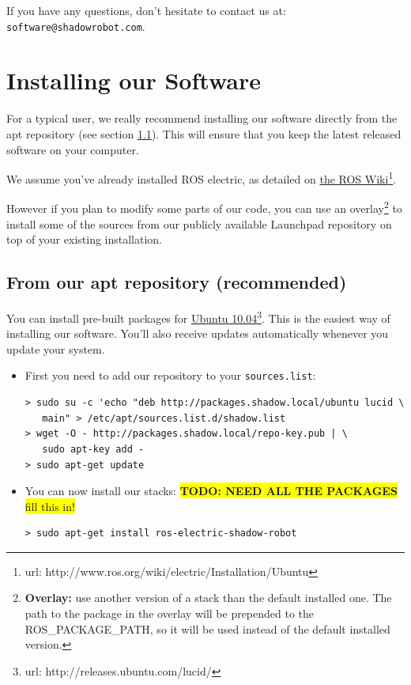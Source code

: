 \documentclass[12pt]{article}
\newcommand{\todo}[1]{\colorbox{yellow}{\textbf{TODO: #1} fill this in!}}
\newcommand{\betterhref}[2]{\href{#1}{#2}\footnote{url: #1}}
\begin{document}
\par If you have any questions, don't hesitate to contact us at: \texttt{software@shadowrobot.com}.\\

\newpage

\section{Installing our Software}
\label{sec:install}
\par For a typical user, we really recommend installing our software directly from the apt repository (see section \ref{sec:install-apt}). This will ensure that you keep the latest released software on your computer.\\

\par We assume you've already installed ROS electric, as detailed on \betterhref{http://www.ros.org/wiki/electric/Installation/Ubuntu}{the ROS Wiki}.\\

\par However if you plan to modify some parts of our code, you can use an overlay\footnote{\textbf{Overlay:} use another version of a stack than the default installed one. The path to the package in the overlay will be prepended to the ROS\_PACKAGE\_PATH, so it will be used instead of the default installed version.} to install some of the sources from our publicly available Launchpad repository on top of your existing installation.

\subsection{From our apt repository (recommended)}
\label{sec:install-apt}
\par You can install pre-built packages for \betterhref{http://releases.ubuntu.com/lucid/}{Ubuntu 10.04}. This is the easiest way of installing our software. You'll also receive updates automatically whenever you update your system.

\begin{itemize}
\item First you need to add our repository to your \texttt{sources.list}:
  \begin{lstlisting}
> sudo su -c 'echo "deb http://packages.shadow.local/ubuntu lucid \
   main" > /etc/apt/sources.list.d/shadow.list
> wget -O - http://packages.shadow.local/repo-key.pub | \
   sudo apt-key add -
> sudo apt-get update
  \end{lstlisting}

\item You can now install our stacks: \todo{NEED ALL THE PACKAGES}
  \begin{lstlisting}
> sudo apt-get install ros-electric-shadow-robot
  \end{lstlisting}

\end{itemize}
\end{document}
